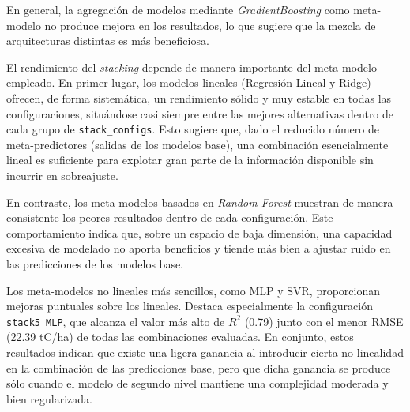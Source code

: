 En general, la agregación de modelos mediante \textit{GradientBoosting} como meta-modelo no produce mejora en los
resultados, lo que sugiere que la mezcla de arquitecturas distintas es más beneficiosa.

El rendimiento del \textit{stacking} depende de manera importante del meta-modelo empleado. En
primer lugar, los modelos lineales (Regresión Lineal y Ridge) ofrecen, de forma sistemática,
un rendimiento sólido y muy estable en todas las configuraciones, situándose casi siempre entre
las mejores alternativas dentro de cada grupo de \texttt{stack\_configs}. Esto sugiere que,
dado el reducido número de meta-predictores (salidas de los modelos base), una combinación
esencialmente lineal es suficiente para explotar gran parte de la información disponible sin
incurrir en sobreajuste.

En contraste, los meta-modelos basados en \textit{Random Forest} muestran de manera consistente
los peores resultados dentro de cada configuración. Este comportamiento indica que, sobre un espacio
de baja dimensión, una capacidad excesiva de modelado no aporta beneficios y tiende más bien a
ajustar ruido en las predicciones de los modelos base.

Los meta-modelos no lineales más sencillos, como MLP y SVR,
proporcionan mejoras puntuales sobre los lineales. Destaca especialmente la configuración
\texttt{stack5\_MLP}, que alcanza el valor más alto de $R^2$ (0.79) junto con el menor
RMSE (22.39 tC/ha) de todas las combinaciones evaluadas. En conjunto, estos resultados indican que existe una ligera
ganancia al introducir cierta no linealidad en la combinación de las predicciones base, pero
que dicha ganancia se produce sólo cuando el modelo de segundo nivel mantiene una complejidad
moderada y bien regularizada.








